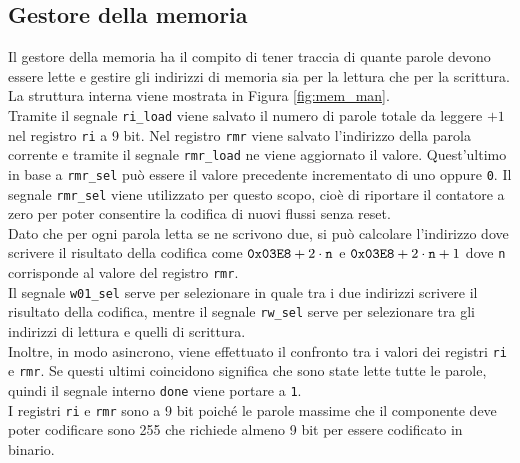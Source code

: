 \documentclass[fleqn,11pt]{article}
\begin{document}
\subsection{Gestore della memoria}
Il gestore della memoria ha il compito di tener traccia di quante parole devono essere lette e gestire gli indirizzi di memoria sia per la lettura che per la scrittura.\\
La struttura interna viene mostrata in Figura \ref{fig:mem_man}.\\
Tramite il segnale \verb|ri_load| viene salvato il numero di parole totale da leggere $+ 1$ nel registro \verb|ri| a 9 bit.
Nel registro \verb|rmr| viene salvato l'indirizzo della parola corrente e tramite il segnale \verb|rmr_load| ne viene aggiornato il valore. Quest'ultimo in base a \verb|rmr_sel| può essere il valore precedente incrementato di uno oppure \verb|0|.
Il segnale \verb|rmr_sel| viene utilizzato per questo scopo, cioè di riportare il contatore a zero per poter consentire la codifica di nuovi flussi senza reset.\\
Dato che per ogni parola letta se ne scrivono due, si può calcolare l'indirizzo dove scrivere il risultato della codifica come \(\verb|0x03E8| + 2\cdot\verb|n|\) e \(\verb|0x03E8| + 2\cdot\verb|n| + 1\) dove \verb|n| corrisponde al valore del registro \verb|rmr|.\\
Il segnale \verb|w01_sel| serve per selezionare in quale tra i due indirizzi scrivere il risultato della codifica, mentre il segnale \verb|rw_sel| serve per selezionare tra gli indirizzi di lettura e quelli di scrittura.\\
Inoltre, in modo asincrono, viene effettuato il confronto tra i valori dei registri \verb|ri| e \verb|rmr|. Se questi ultimi coincidono significa che sono state lette tutte le parole, quindi il segnale interno \verb|done| viene portare a \verb|1|.\\
I registri \verb|ri| e \verb|rmr| sono a 9 bit poiché le parole massime che il componente deve poter codificare sono 255 che richiede almeno 9 bit per essere codificato in binario.
\end{document}
